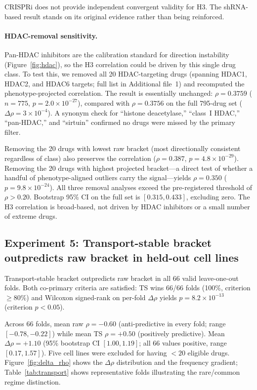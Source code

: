 \documentclass[11pt]{article}
\begin{document}
CRISPRi does not provide independent convergent validity for H3. The
shRNA-based result stands on its original evidence rather than being
reinforced.

\paragraph{HDAC-removal sensitivity.}
Pan-HDAC inhibitors are the calibration standard for direction instability
(Figure~\ref{fig:hdac}), so the H3 correlation could be driven by this
single drug class. To test this, we removed all 20 HDAC-targeting drugs
(spanning HDAC1, HDAC2, and HDAC6 targets; full list in Additional file~1)
and recomputed the phenotype-projected correlation. The result is
essentially unchanged: $\rho = 0.3759$ ($n = 775$,
$p = 2.0 \times 10^{-27}$), compared with $\rho = 0.3756$ on the full
795-drug set ($\Delta\rho = 3 \times 10^{-4}$). A synonym check for ``histone
deacetylase,'' ``class~I HDAC,'' ``pan-HDAC,'' and ``sirtuin'' confirmed
no drugs were missed by the primary filter.

Removing the 20 drugs with lowest raw bracket (most directionally
consistent regardless of class) also preserves the correlation
($\rho = 0.387$, $p = 4.8 \times 10^{-29}$). Removing the 20 drugs with
highest projected bracket---a direct test of whether a handful of
phenotype-aligned outliers carry the signal---yields $\rho = 0.350$
($p = 9.8 \times 10^{-24}$). All three removal analyses exceed the
pre-registered threshold of $\rho > 0.20$. Bootstrap 95\% CI on the full
set is $[0.315, 0.433]$, excluding zero. The H3 correlation is broad-based,
not driven by HDAC inhibitors or a small number of extreme drugs.

\subsection{Experiment 5: Transport-stable bracket outpredicts raw bracket in held-out cell lines}
\label{sec:exp5}

Transport-stable bracket outpredicts raw bracket in all 66 valid
leave-one-out folds. Both co-primary criteria are satisfied:
TS wins 66/66 folds (100\%, criterion $\geq 80\%$) and Wilcoxon
signed-rank on per-fold $\Delta\rho$ yields $p = 8.2 \times 10^{-13}$
(criterion $p < 0.05$).

Across 66 folds, mean raw $\rho = -0.60$ (anti-predictive in every
fold; range $[-0.78, -0.22]$) while mean TS $\rho = +0.50$ (positively
predictive). Mean $\Delta\rho = +1.10$ (95\% bootstrap CI
$[1.00, 1.19]$; all 66 values positive, range $[0.17, 1.57]$). Five
cell lines were excluded for having $< 20$ eligible drugs.
Figure~\ref{fig:delta_rho} shows the $\Delta\rho$ distribution and the
frequency gradient; Table~\ref{tab:transport} shows representative folds
illustrating the rare/common regime distinction.
\end{document}
